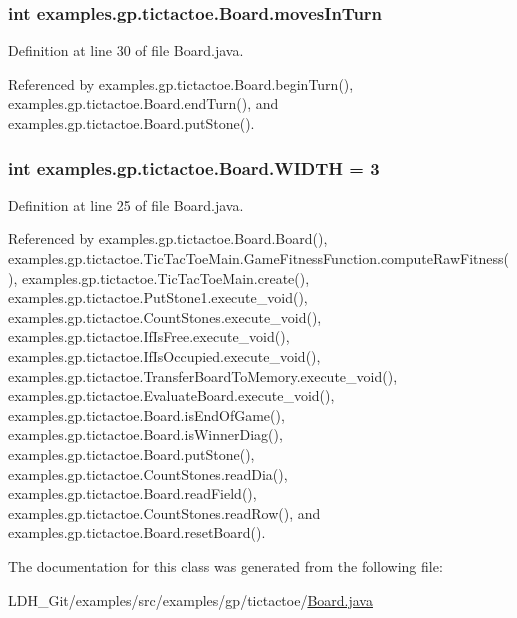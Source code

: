 \hypertarget{classexamples_1_1gp_1_1tictactoe_1_1_board_a46d9da07a0b53107047b89120aab646d}{
\subsubsection[{moves\-In\-Turn}]{\setlength{\rightskip}{0pt plus 5cm}int examples.\-gp.\-tictactoe.\-Board.\-moves\-In\-Turn\hspace{0.3cm}{\ttfamily [private]}}}\label{classexamples_1_1gp_1_1tictactoe_1_1_board_a46d9da07a0b53107047b89120aab646d}


Definition at line 30 of file Board.\-java.



Referenced by examples.\-gp.\-tictactoe.\-Board.\-begin\-Turn(), examples.\-gp.\-tictactoe.\-Board.\-end\-Turn(), and examples.\-gp.\-tictactoe.\-Board.\-put\-Stone().

\hypertarget{classexamples_1_1gp_1_1tictactoe_1_1_board_a09c11cc14ebbe4fdabb088a97fcfd5ea}{
\subsubsection[{W\-I\-D\-T\-H}]{\setlength{\rightskip}{0pt plus 5cm}int examples.\-gp.\-tictactoe.\-Board.\-W\-I\-D\-T\-H = 3\hspace{0.3cm}{\ttfamily [static]}}}\label{classexamples_1_1gp_1_1tictactoe_1_1_board_a09c11cc14ebbe4fdabb088a97fcfd5ea}


Definition at line 25 of file Board.\-java.



Referenced by examples.\-gp.\-tictactoe.\-Board.\-Board(), examples.\-gp.\-tictactoe.\-Tic\-Tac\-Toe\-Main.\-Game\-Fitness\-Function.\-compute\-Raw\-Fitness(), examples.\-gp.\-tictactoe.\-Tic\-Tac\-Toe\-Main.\-create(), examples.\-gp.\-tictactoe.\-Put\-Stone1.\-execute\-\_\-void(), examples.\-gp.\-tictactoe.\-Count\-Stones.\-execute\-\_\-void(), examples.\-gp.\-tictactoe.\-If\-Is\-Free.\-execute\-\_\-void(), examples.\-gp.\-tictactoe.\-If\-Is\-Occupied.\-execute\-\_\-void(), examples.\-gp.\-tictactoe.\-Transfer\-Board\-To\-Memory.\-execute\-\_\-void(), examples.\-gp.\-tictactoe.\-Evaluate\-Board.\-execute\-\_\-void(), examples.\-gp.\-tictactoe.\-Board.\-is\-End\-Of\-Game(), examples.\-gp.\-tictactoe.\-Board.\-is\-Winner\-Diag(), examples.\-gp.\-tictactoe.\-Board.\-put\-Stone(), examples.\-gp.\-tictactoe.\-Count\-Stones.\-read\-Dia(), examples.\-gp.\-tictactoe.\-Board.\-read\-Field(), examples.\-gp.\-tictactoe.\-Count\-Stones.\-read\-Row(), and examples.\-gp.\-tictactoe.\-Board.\-reset\-Board().



The documentation for this class was generated from the following file\-:\begin{DoxyCompactItemize}
\item 
L\-D\-H\-\_\-\-Git/examples/src/examples/gp/tictactoe/\hyperlink{_board_8java}{Board.\-java}\end{DoxyCompactItemize}
